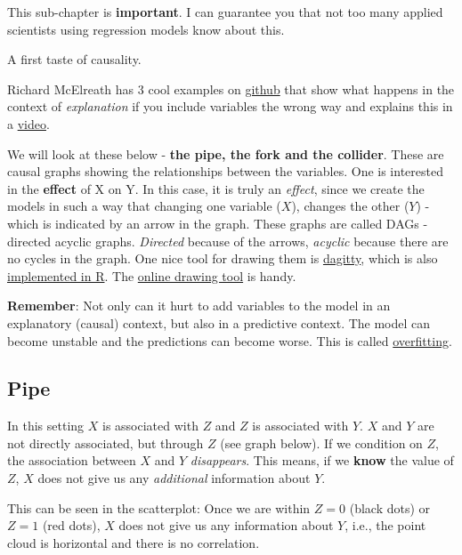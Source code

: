 \documentclass[
]{book}
\begin{document}
This sub-chapter is \textbf{important}. I can guarantee you that not too many applied
scientists using regression models know about this.

A first taste of causality.

Richard McElreath has 3 cool examples on
\href{https://github.com/rmcelreath/causal_salad_2021/blob/main/1_causal_salad.r}{github}
that show what happens in the context of \emph{explanation} if you include variables the wrong
way and explains this in a
\href{https://www.youtube.com/watch?v=KNPYUVmY3NM&ab_channel=RichardMcElreath}{video}.

We will look at these below - \textbf{the pipe, the fork and the collider}. These are causal graphs showing the
relationships between the variables. One is interested in the \textbf{effect} of X on Y.
In this case, it is truly an \emph{effect}, since we create the models in such a way that changing
one variable (\(X\)), changes the other (\(Y\)) - which is indicated by an arrow in the graph.
These graphs are called DAGs - directed acyclic graphs. \emph{Directed} because of the arrows,
\emph{acyclic} because there are no cycles in the graph. One nice tool for drawing them is
\href{https://www.dagitty.net/}{dagitty}, which is also
\href{https://cran.r-project.org/web/packages/dagitty/index.html}{implemented in R}.
The \href{https://www.dagitty.net/dags.html}{online drawing tool} is handy.

\textbf{Remember}: Not only can it hurt to add variables to the model in an explanatory (causal) context,
but also in a predictive context. The model can become unstable and the predictions
can become worse. This is called \href{https://en.wikipedia.org/wiki/Overfitting}{overfitting}.

\subsection{Pipe}\label{pipe}

In this setting \(X\) is associated with \(Z\) and \(Z\) is associated with \(Y\).
\(X\) and \(Y\) are not directly associated, but through \(Z\) (see graph below).
If we condition on \(Z\), the association between \(X\) and \(Y\) \emph{disappears}.
This means, if we \textbf{know} the value of \(Z\), \(X\) does not give us any \emph{additional} information about \(Y\).

This can be seen in the scatterplot: Once we are within \(Z=0\) (black dots) or \(Z=1\) (red dots),
\(X\) does not give us any information about \(Y\),
i.e., the point cloud is horizontal and there is no correlation.
\end{document}

